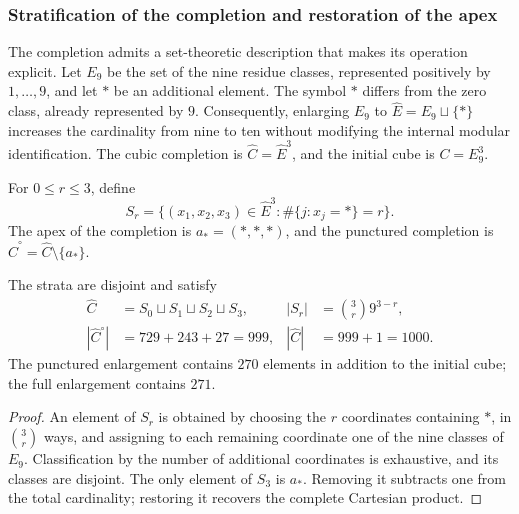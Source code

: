 \subsubsection{Stratification of the completion and restoration of the apex}
\label{sec:revision-emrh}

The completion admits a set-theoretic description that makes its operation
explicit. Let \(E_9\) be the set of the nine residue classes, represented
positively by \(1,\ldots,9\), and let \(\ast\) be an additional element.
The symbol \(\ast\) differs from the zero class, already represented by \(9\).
Consequently, enlarging \(E_9\) to
\(\widehat E=E_9\sqcup\{\ast\}\) increases the cardinality from nine to ten
without modifying the internal modular identification. The cubic completion is
\(\widehat C=\widehat E^3\), and the initial cube is \(C=E_9^3\).

\begin{definition}
For \(0\leq r\leq3\), define
\[
 S_r=\{(x_1,x_2,x_3)\in\widehat E^3:
             \#\{j:x_j=\ast\}=r\}.
\]
The apex of the completion is \(a_\ast=(\ast,\ast,\ast)\), and the
punctured completion is \(\widehat C^{\circ}=\widehat C\setminus\{a_\ast\}\).
\end{definition}

\begin{proposition}
The strata are disjoint and satisfy
\begin{align}
 \widehat C&=S_0\sqcup S_1\sqcup S_2\sqcup S_3,
 &|S_r|&=\binom3r9^{3-r},\label{eq:revision-estratos}\\
 |\widehat C^{\circ}|&=729+243+27=999,
 &|\widehat C|&=999+1=1000.\label{eq:revision-999}
\end{align}
The punctured enlargement contains \(270\) elements in addition to the initial
cube; the full enlargement contains \(271\).
\end{proposition}
\begin{proof}
An element of \(S_r\) is obtained by choosing the \(r\) coordinates
containing \(\ast\), in \(\binom3r\) ways, and assigning to each remaining
coordinate one of the nine classes of \(E_9\). Classification by the number
of additional coordinates is exhaustive, and its classes are disjoint. The only
element of \(S_3\) is \(a_\ast\). Removing it subtracts one from the total
cardinality; restoring it recovers the complete Cartesian product.
\end{proof}

